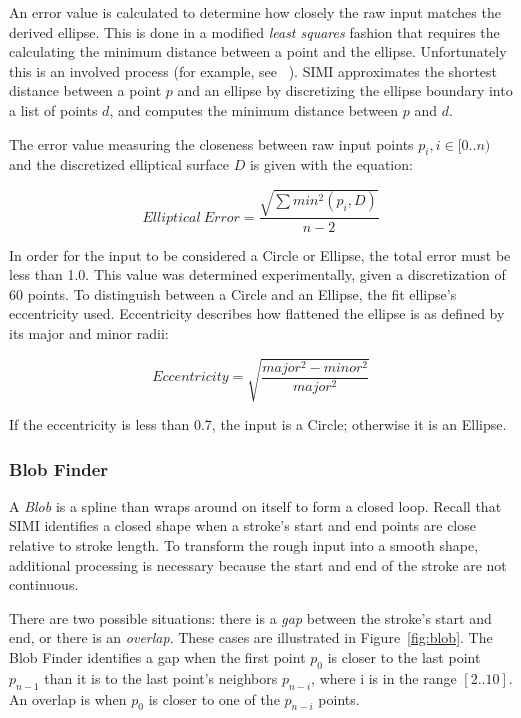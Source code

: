 An error value is calculated to determine how closely the raw input
matches the derived ellipse. This is done in a modified \textit{least
  squares} fashion that requires the calculating the minimum distance
between a point and the ellipse. Unfortunately this is an involved
process (for example, see ~\cite{eberly-point-to-ellipse}). SIMI
approximates the shortest distance between a point $p$ and an ellipse
by discretizing the ellipse boundary into a list of points $d$, and
computes the minimum distance between $p$ and $d$.

The error value measuring the closeness between raw input points $p_i,
i \in [0..n)$ and the discretized elliptical surface $D$ is given with
  the equation:

\begin{equation}
Elliptical\:Error = \frac{
\sqrt{
\sum min^2(p_i, D)
}
}{
n-2
}
\end{equation}

In order for the input to be considered a Circle or Ellipse, the total
error must be less than 1.0. This value was determined experimentally,
given a discretization of 60 points. To distinguish between a Circle
and an Ellipse, the fit ellipse's eccentricity used. Eccentricity
describes how flattened the ellipse is as defined by its major and
minor radii:

\begin{equation}
Eccentricity = \sqrt{\dfrac{major^2-minor^2}{major^2}}
\end{equation}

If the eccentricity is less than 0.7, the input is a Circle; otherwise
it is an Ellipse.

\subsubsection{Blob Finder}

A \textit{Blob} is a spline than wraps around on itself to form a
closed loop. Recall that SIMI identifies a closed shape when a
stroke's start and end points are close relative to stroke length. To
transform the rough input into a smooth shape, additional processing
is necessary because the start and end of the stroke are not
continuous.



There are two possible situations: there is a \textit{gap} between the
stroke's start and end, or there is an \textit{overlap}. These cases
are illustrated in Figure~\ref{fig:blob}. The Blob Finder identifies a
gap when the first point $p_0$ is closer to the last point $p_{n-1}$
than it is to the last point's neighbors $p_{n-i}$, where i is in the
range $[2..10]$. An overlap is when $p_0$ is closer to one of the
$p_{n-i}$ points.

